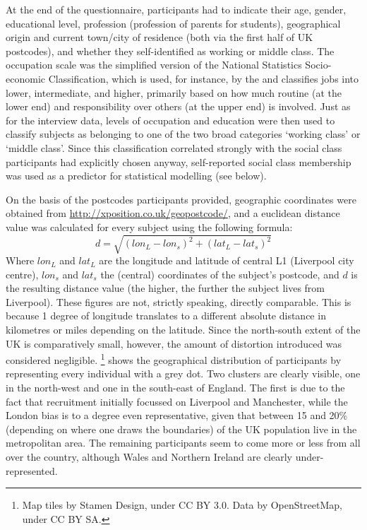 At the end of the questionnaire, participants had to indicate their age, gender, educational level, profession (profession of parents for students), geographical origin and current town/city of residence (both via the first half of UK postcodes), and whether they self-identified as working or middle class.
The occupation scale was the simplified version of the National Statistics Socio-economic Classification, which is used, for instance, by the \citeauthor{nomis} and classifies jobs into lower, intermediate, and higher, primarily based on how much routine (at the lower end) and responsibility over others (at the upper end) is involved.
Just as for the interview data, levels of occupation and education were then used to classify subjects as belonging to one of the two broad categories `working class' or `middle class'.
Since this classification correlated strongly with the social class participants had explicitly chosen anyway, self-reported social class membership was used as a predictor for statistical modelling (see below).

On the basis of the postcodes participants provided, geographic coordinates were obtained from \url{http://xposition.co.uk/geopostcode/}, and a euclidean distance value was calculated for every subject using the following formula:
\begin{equation}
d = \sqrt{(lon_L - lon_s)^2 + (lat_L - lat_s)^2}
\end{equation}
Where \(lon_L\) and \(lat_L\) are the longitude and latitude of central L1 (Liverpool city centre), \(lon_s\) and \(lat_s\) the (central) coordinates of the subject's postcode, and \(d\) is the resulting distance value (the higher, the further the subject lives from Liverpool).
These figures are not, strictly speaking, directly comparable.
This is because 1 degree of longitude translates to a different absolute distance in kilometres or miles depending on the latitude.
Since the north-south extent of the UK is comparatively small, however, the amount of distortion introduced was considered negligible.
\footnote{Map tiles by Stamen Design, under CC BY 3.0. Data by OpenStreetMap, under CC BY SA.} shows the geographical distribution of participants by representing every individual with a grey dot.
Two clusters are clearly visible, one in the north-west and one in the south-east of England.
The first is due to the fact that recruitment initially focussed on Liverpool and Manchester, while the London bias is to a degree even representative, given that between 15 and 20\% (depending on where one draws the boundaries) of the UK population live in the metropolitan area.
The remaining participants seem to come more or less from all over the country, although Wales and Northern Ireland are clearly under-represented.

